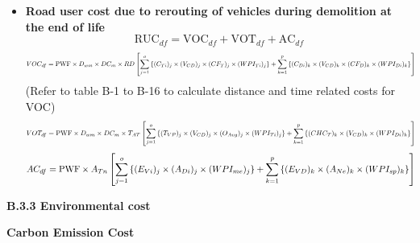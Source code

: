 \documentclass[12pt,a4paper]{article}
\begin{document}
\begin{itemize}
  \item \textbf{Road user cost due to rerouting of vehicles during demolition at the end of life}
    \[ \mathrm{RUC}_{df} = \mathrm{VOC}_{df} + \mathrm{VOT}_{df} + \mathrm{AC}_{df} \]
    \[
    \resizebox{\linewidth}{!}{$\displaystyle
    VOC_{df} = \mathrm{PWF} \times D_{wm} \times DC_m \times RD \left[
      \sum_{j=1}^{o} \left\{ (C_{Ti})_j \times (V_{CD})_j \times (CF_T)_j \times (WPI_{Ti})_j \right\}
      + \sum_{k=1}^{p} \left\{ (C_{Di})_k \times (V_{CD})_k \times (CF_D)_k \times (WPI_{Di})_k \right\}
    \right]
    $}
    \]
    (Refer to table B-1 to B-16 to calculate distance and time related costs for VOC)
    \[
    \resizebox{\linewidth}{!}{$\displaystyle
    VOT_{df} = \mathrm{PWF} \times D_{wm} \times DC_m \times T_{AT} \left[
      \sum_{j=1}^{o} \left\{ (T_{VP})_j \times (V_{CD})_j \times (O_{Avg})_j \times (WPI_{Ti})_j \right\}
      + \sum_{k=1}^{p} \left\{ (CHC_T)_k \times (V_{CD})_k \times (WPI_{Di})_k \right\}
    \right]
    $}
    \]
    \[
    \resizebox{\linewidth}{!}{$\displaystyle
    AC_{df} = \mathrm{PWF} \times A_{Tn} \left[
      \sum_{j=1}^{o} \left\{ (E_{Vi})_j \times (A_{Di})_j \times (WPI_{me})_j \right\}
      + \sum_{k=1}^{p} \left\{ (E_{VD})_k \times (A_{Ne})_k \times (WPI_{sp})_k \right\}
    \right]
    $}
    \]
\end{itemize}

\vspace{0.3em}
\textbf{B.3.3 Environmental cost}

\textbf{Carbon Emission Cost}
\end{document}
